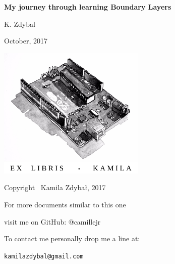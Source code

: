 \documentclass[12pt]{report}
\begin{document}
\begin{titlepage}
    \begin{center}

		\vspace*{6cm}
        \LARGE     
		
        \Huge
        \textbf{My journey through learning Boundary Layers}
        
        \vspace*{1cm}
        


        \vspace{2cm}
        
        \LARGE
        K. Zdybal

        \vspace{6cm}
		\Large

		\vspace{1cm}

 		October, 2017
	\end{center}
\end{titlepage}



\thispagestyle{empty}
\begin{center}
    
\vspace*{4cm}

\includegraphics[width = 70mm]{arduino_dwg.jpg}

\vspace*{2cm}

Copyright \textcopyright \, Kamila Zdybał, 2017

For more documents similar to this one 

visit me on GitHub: @camillejr

To contact me personally drop me a line at:

\verb|kamilazdybal@gmail.com|

\end{center}
\newpage
\end{document}
